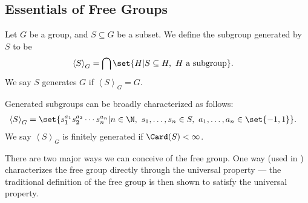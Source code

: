 \subsection{Essentials of Free Groups}%
\begin{definition}
  Let $G$ be a group, and $S\subseteq G$ be a subset. We define the subgroup {generated by} $S$ to be
  \begin{align*}
    \left\langle S \right\rangle_{G} &= \bigcap \set{H | S\subseteq H,~H\text{ a subgroup}}.
  \end{align*}
  We say $S$ generates $G$ if $\left\langle S \right\rangle_{G} = G$.\newline

  Generated subgroups can be broadly characterized as follows:
  \begin{align*}
    \left\langle S \right\rangle_{G} &= \set{s_1^{a_1}s_2^{a_2}\cdots s_n^{a_n} | n\in\N,~s_1,\dots,s_n\in S,~a_1,\dots,a_n\in \set{-1,1}}.
  \end{align*}
  We say $\left\langle S \right\rangle_{G}$ is finitely generated if $\Card(S) < \infty$.
\end{definition}
There are two major ways we can conceive of the free group. One way (used in \cite{loh_geometric_group_theory}) characterizes the free group directly through the universal property --- the traditional definition of the free group is then shown to satisfy the universal property.\newline

